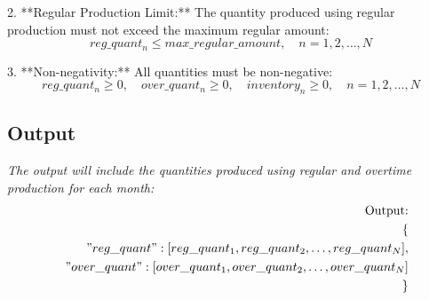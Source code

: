 \documentclass{article}
\begin{document}
2. **Regular Production Limit:**
   The quantity produced using regular production must not exceed the maximum regular amount:
   \[
   reg\_quant_n \leq max\_regular\_amount, \quad n = 1, 2, \ldots, N
   \]

3. **Non-negativity:**
   All quantities must be non-negative:
   \[
   reg\_quant_n \geq 0, \quad over\_quant_n \geq 0, \quad inventory_n \geq 0, \quad n = 1, 2, \ldots, N
   \]

\subsection*{Output}
\textit{The output will include the quantities produced using regular and overtime production for each month:}
\begin{align*}
    \text{Output:} \\
    \{ \\
    \quad "reg\_quant": [reg\_quant_1, reg\_quant_2, \ldots, reg\_quant_N], \\
    \quad "over\_quant": [over\_quant_1, over\_quant_2, \ldots, over\_quant_N] \\
    \}
\end{align*}
\end{document}
